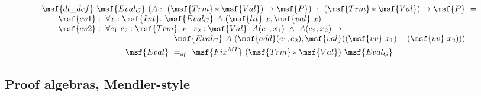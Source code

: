 \documentclass[submission,copyright,creativecommons]{eptcs}
\begin{document}
\begin{gather}
\begin{array}{lll}
\msf{dt\_def} \ \msf{Eval_G} \ 
(A: \ (\msf{Trm} * \msf{Val}) \to \msf{P})
 \ : \ (\msf{Trm} * \msf{Val}) \to \msf{P} \ = \\
\qquad \msf{ev1}: \ \forall x:\msf{Int}. \ \msf{Eval_G} \ A
\ (\msf{lit} \ x, \msf{val} \ x) \\
\qquad \msf{ev2}: \ \forall e_1 \ e_2: \msf{Trm}, x_1 \ x_2: \msf{Val}. \ A
 (e_1,x_1) \ \land \ A (e_2,x_2) \to \\
\qquad \qquad \qquad \qquad \qquad \qquad \qquad \qquad \msf{Eval_G} \ A
 \ (\msf{add}(e_1,e_2), \msf{val}((\msf{vv} \ x_1) + (\msf{vv} \ x_2)))
\end{array} \\
\label{def:Eval}
\msf{Eval} \ =_{df} \ \msf{Fix^{MI}} \ (\msf{Trm}*\msf{Val}) \ \msf{Eval_G} 
\end{gather}



\subsection{Proof algebras, Mendler-style}
\end{document}

